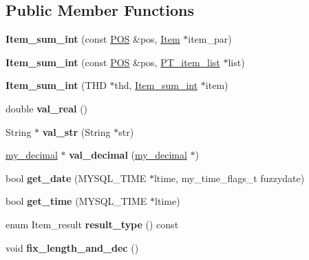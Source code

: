 \subsection*{Public Member Functions}
\begin{DoxyCompactItemize}
\item 
\mbox{\label{classItem__sum__int_a6e396ccdf8664c2b437698fcfd9f2f5d}} 
{\bfseries Item\+\_\+sum\+\_\+int} (const \mbox{\hyperlink{structYYLTYPE}{P\+OS}} \&pos, \mbox{\hyperlink{classItem}{Item}} $\ast$item\+\_\+par)
\item 
\mbox{\label{classItem__sum__int_ad12702f9bff31647f425d509db59281c}} 
{\bfseries Item\+\_\+sum\+\_\+int} (const \mbox{\hyperlink{structYYLTYPE}{P\+OS}} \&pos, \mbox{\hyperlink{classPT__item__list}{P\+T\+\_\+item\+\_\+list}} $\ast$list)
\item 
\mbox{\label{classItem__sum__int_a429efb6f4f5c0a9ee7bd2d1443996ebd}} 
{\bfseries Item\+\_\+sum\+\_\+int} (T\+HD $\ast$thd, \mbox{\hyperlink{classItem__sum__int}{Item\+\_\+sum\+\_\+int}} $\ast$item)
\item 
\mbox{\label{classItem__sum__int_ab0d1ef3fdca8f31e5287a8d9189e3a8a}} 
double {\bfseries val\+\_\+real} ()
\item 
\mbox{\label{classItem__sum__int_a35438884418a073e32cb5fba042b2e30}} 
String $\ast$ {\bfseries val\+\_\+str} (String $\ast$str)
\item 
\mbox{\label{classItem__sum__int_ae25dcf1d91b3b5eadf8918b79efdf9c2}} 
\mbox{\hyperlink{classmy__decimal}{my\+\_\+decimal}} $\ast$ {\bfseries val\+\_\+decimal} (\mbox{\hyperlink{classmy__decimal}{my\+\_\+decimal}} $\ast$)
\item 
\mbox{\label{classItem__sum__int_a7de46697a2e498abf7c7a9af5c51fbc2}} 
bool {\bfseries get\+\_\+date} (M\+Y\+S\+Q\+L\+\_\+\+T\+I\+ME $\ast$ltime, my\+\_\+time\+\_\+flags\+\_\+t fuzzydate)
\item 
\mbox{\label{classItem__sum__int_a6d3d6a09707511cc9594ec54fa982be6}} 
bool {\bfseries get\+\_\+time} (M\+Y\+S\+Q\+L\+\_\+\+T\+I\+ME $\ast$ltime)
\item 
\mbox{\label{classItem__sum__int_ad240e9a23d81a3322ff228cd4f9427aa}} 
enum Item\+\_\+result {\bfseries result\+\_\+type} () const
\item 
\mbox{\label{classItem__sum__int_a393d6ebc9c084ffa008aae3fd9e60482}} 
void {\bfseries fix\+\_\+length\+\_\+and\+\_\+dec} ()
\end{DoxyCompactItemize}
